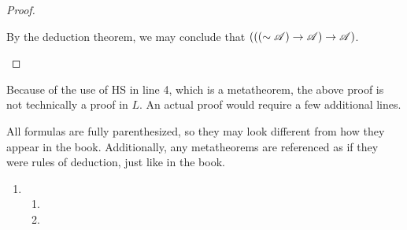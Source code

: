 \begin{proposition}
\begin{proof}
\begin{enumerate}[label=(\alph*), align=left]
        By the deduction theorem, we may conclude that \((((\sim\mathscr{A}) \rightarrow \mathscr{A}) \rightarrow \mathscr{A})\).
    \end{enumerate}
  \end{proof}

  \note{} Because of the use of HS in line 4, which is a metatheorem, the above proof is not technically a proof in \(L\). An actual proof would require a few additional lines.
\end{proposition}

\solutions{}

\note{} All formulas are fully parenthesized, so they may look different from how they appear in the book. Additionally, any metatheorems are referenced as if they were rules of deduction, just like in the book.
%
\begin{enumerate}
  \item %
    \begin{enumerate}[label=(\alph*), align=left]
      \item

      \item \footnotesize
      \normalsize


\end{enumerate}
\end{enumerate}
